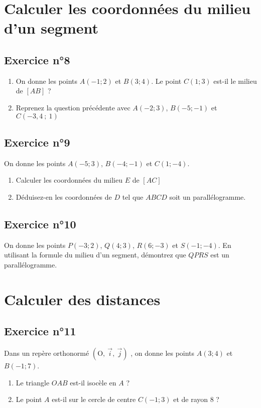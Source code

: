 \documentclass[12pt,a4paper]{article}
\def\Oij{$\left(\text{O},~\vec{i},~\vec{j}\right)$}
\begin{document}
\section{Calculer les coordonnées du milieu d'un segment}
\subsection*{Exercice n°8}

\begin{enumerate}
    \item On donne les points $A(-1;2)$ et $B(3;4)$.
Le point $C(1;3)$ est-il le milieu de $[AB]$ ?
\item Reprenez la question précédente avec $A(-2;3)$, $B(-5;-1)$ et $C(-3,4~;~1)$
\end{enumerate}


\subsection*{Exercice n°9}

On donne les points $A(-5;3)$, $B(-4;-1)$ et $C(1;-4)$.

\begin{enumerate}
    \item Calculer les coordonnées du milieu $E$ de $[AC]$
    \item Déduisez-en les coordonnées de $D$ tel que $ABCD$ soit un parallélogramme.
\end{enumerate}

\subsection*{Exercice n°10}

On donne les points $P(-3;2)$, $Q(4;3)$, $R(6;-3)$ et $S(-1;-4)$.
En utilisant la formule du milieu d'un segment, démontrez que $QPRS$ est un parallélogramme.

\section{Calculer des distances}
\subsection*{Exercice n°11}

Dans un repère orthonormé \Oij{} , on donne les points $A(3;4)$ et $B(-1;7)$.

\begin{enumerate}
    \item Le triangle $OAB$ est-il isocèle en $A$ ?
    \item Le point $A$ est-il sur le cercle de centre $C(-1;3)$ et de rayon $8$ ?
\end{enumerate}
\end{document}
